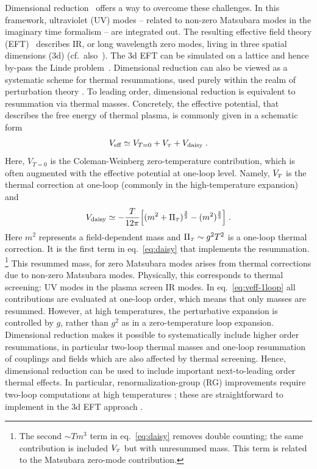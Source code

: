 \documentclass[11pt]{article}
\newcommand{\T}{\rmii{$T$}}
\renewcommand{\rmi}[1]{{\mbox{\scriptsize #1}}}
\newcommand{\rmii}[1]{{\mbox{\tiny\rm{#1}}}}
\begin{document}
Dimensional reduction~\cite{Ginsparg:1980ef,Appelquist:1981vg} offers a way to overcome these challenges.
In this framework,
ultraviolet (UV) modes --
related to non-zero Matsubara modes in the imaginary time formalism --
are integrated out. 
The resulting effective field theory (EFT)~\cite{Kajantie:1995dw,Braaten:1995cm} describes
IR, or
long wavelength zero modes, living in three spatial dimensions (3d)
(cf.\ also~\cite{Kajantie:1997hn,Andersen:1997ba,Andersen:1996dh}).
The 3d EFT can be simulated on a lattice and hence by-pass
the Linde problem~\cite{Braaten:1994na,Farakos:1994xh}. 
Dimensional reduction can also be viewed as
a systematic scheme for thermal resummations, used purely within the realm of perturbation theory \cite{Farakos:1994kx}.
To leading order, dimensional reduction is equivalent to resummation via thermal masses.
Concretely, the effective potential,
that describes the free energy of thermal plasma,
is commonly given in a schematic form~\cite{Arnold:1992rz}
\begin{align}
\label{eq:veff-1loop}
  V_{\rmi{eff}} \simeq
      V_{T=0}
    + V_{\T}
    + V_{\rmi{daisy}}
  \;. 
\end{align}
Here,
$V_{T=0}$ is the Coleman-Weinberg zero-temperature contribution,
which is often augmented with the effective potential at one-loop level.
Namely,
$V_{\T}$ is the thermal correction at one-loop
(commonly in the high-temperature expansion) and
\begin{align}
\label{eq:daisy}
V_{\rmi{daisy}} \simeq
    - \frac{T}{12\pi} \Big[
        (m^2 + \Pi_\T)^\frac{3}{2}
      - (m^2)^{\frac{3}{2}}
    \Big]
    \;. 
\end{align}
Here $m^2$ represents a field-dependent mass and $\Pi_\T \sim g^2 T^2$ is a one-loop thermal correction. It is the first term in eq.~\eqref{eq:daisy} that implements the resummation.%
\footnote{
  The second $\sim T m^3$ term in eq.~\eqref{eq:daisy}
  removes double counting;
  the same contribution is included $V_\T$ but with unresummed mass.
  This term is related to the Matsubara zero-mode contribution.
}
This resummed mass, for zero Matsubara modes arises from thermal corrections due to
non-zero Matsubara modes.
Physically, this corresponds to thermal screening:
UV modes in the plasma screen IR modes.
In eq.~\eqref{eq:veff-1loop} all contributions are evaluated at one-loop order, which means that only masses are resummed.
However, at high temperatures, the perturbative expansion is controlled by $g$, rather than $g^2$ as in a zero-temperature loop expansion.
Dimensional reduction makes it possible to systematically include
higher order resummations, in particular two-loop thermal masses and one-loop resummation of couplings and fields
which are also affected by thermal screening.
Hence, dimensional reduction can be used to include important
next-to-leading order thermal effects.
In particular, renormalization-group (RG) improvements require two-loop computations
at high temperatures \cite{Arnold:1992rz,Gould:2021oba}; these are straightforward to implement in the 3d EFT approach \cite{Farakos:1994kx}.
\end{document}
